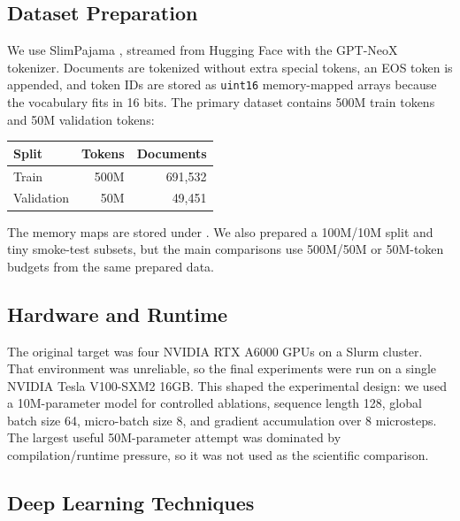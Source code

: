 \documentclass[conference]{IEEEtran}
\begin{document}
\subsection{Dataset Preparation}

We use SlimPajama \cite{slimpajama}, streamed from Hugging Face with the GPT-NeoX tokenizer. Documents are tokenized without extra special tokens, an EOS token is appended, and token IDs are stored as \texttt{uint16} memory-mapped arrays because the vocabulary fits in 16 bits. The primary dataset contains 500M train tokens and 50M validation tokens:
\begin{center}
\begin{tabular}{@{}lrr@{}}
\toprule
Split & Tokens & Documents\\
\midrule
Train & 500M & 691,532\\
Validation & 50M & 49,451\\
\bottomrule
\end{tabular}
\end{center}
The memory maps are stored under . We also prepared a 100M/10M split and tiny smoke-test subsets, but the main comparisons use 500M/50M or 50M-token budgets from the same prepared data.

\subsection{Hardware and Runtime}

The original target was four NVIDIA RTX A6000 GPUs on a Slurm cluster. That environment was unreliable, so the final experiments were run on a single NVIDIA Tesla V100-SXM2 16GB. This shaped the experimental design: we used a 10M-parameter model for controlled ablations, sequence length 128, global batch size 64, micro-batch size 8, and gradient accumulation over 8 microsteps. The largest useful 50M-parameter attempt was dominated by compilation/runtime pressure, so it was not used as the scientific comparison.

\subsection{Deep Learning Techniques}
\end{document}
